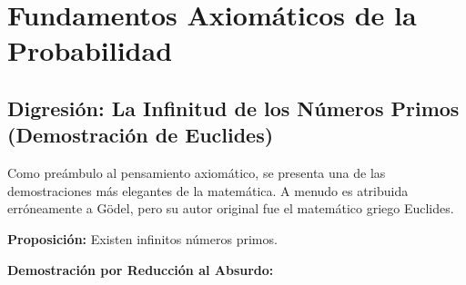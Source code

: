 \documentclass[12pt, letterpaper]{article}
\begin{document}
\section{Fundamentos Axiomáticos de la Probabilidad}
\subsection{Digresión: La Infinitud de los Números Primos (Demostración de Euclides)}
Como preámbulo al pensamiento axiomático, se presenta una de las demostraciones más elegantes de la matemática. A menudo es atribuida erróneamente a Gödel, pero su autor original fue el matemático griego Euclides.

\noindent\textbf{Proposición:} Existen infinitos números primos.

\noindent\textbf{Demostración por Reducción al Absurdo:}
\end{document}
